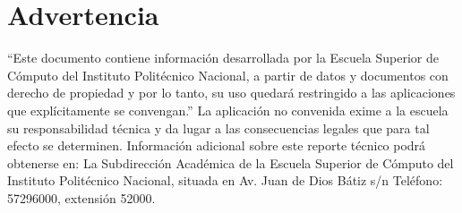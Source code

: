 \chapter{Advertencia}

``Este documento contiene información desarrollada por la Escuela Superior de Cómputo del Instituto Politécnico Nacional, a partir de datos y documentos con derecho de propiedad y por lo tanto, su uso quedará restringido a las aplicaciones que explícitamente se convengan.”  La aplicación no convenida exime a la escuela su responsabilidad técnica y da lugar a las consecuencias legales que para tal efecto se determinen. Información adicional sobre este reporte técnico podrá obtenerse en: La Subdirección Académica de la Escuela Superior de Cómputo del Instituto Politécnico Nacional, situada en Av. Juan de Dios Bátiz s/n Teléfono: 57296000, extensión 52000.
